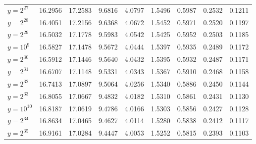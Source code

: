 \documentclass{article}
\theoremstyle{definition}
\begin{document}
\begin{table}[h!]
\begin{tabular}{l | rrrrrrrr}
        \hline
        $y = 2^{27}$  & 16.2956 & 17.2583               & 9.6816                & 4.0797                & 1.5496                & 0.5987                & 0.2532                & 0.1211                \\
        $y = 2^{28}$  & 16.4051 & 17.2156               & 9.6368                & 4.0672                & 1.5452                & 0.5971                & 0.2520                & 0.1197                \\
        $y = 2^{29}$  & 16.5032 & 17.1778               & 9.5983                & 4.0542                & 1.5425                & 0.5952                & 0.2503                & 0.1185                \\
        \hline
        $y = 10^{9}$  & 16.5827 & 17.1478               & 9.5672                & 4.0444                & 1.5397                & 0.5935                & 0.2489                & 0.1172                \\
        \hline
        $y = 2^{30}$  & 16.5912 & 17.1446               & 9.5640                & 4.0432                & 1.5395                & 0.5932                & 0.2487                & 0.1171                \\
        $y = 2^{31}$  & 16.6707 & 17.1148               & 9.5331                & 4.0343                & 1.5367                & 0.5910                & 0.2468                & 0.1158                \\
        $y = 2^{32}$  & 16.7413 & 17.0897               & 9.5064                & 4.0256                & 1.5340                & 0.5886                & 0.2450                & 0.1144                \\
        $y = 2^{33}$  & 16.8055 & 17.0667               & 9.4832                & 4.0182                & 1.5310                & 0.5861                & 0.2431                & 0.1130                \\
        \hline
        $y = 10^{10}$ & 16.8187 & 17.0619               & 9.4786                & 4.0166                & 1.5303                & 0.5856                & 0.2427                & 0.1128                \\
        \hline
        $y = 2^{34}$  & 16.8634 & 17.0465               & 9.4627                & 4.0114                & 1.5280                & 0.5838                & 0.2412                & 0.1117                \\
        $y = 2^{35}$  & 16.9161 & 17.0284               & 9.4447                & 4.0053                & 1.5252                & 0.5815                & 0.2393                & 0.1103                \\

\end{tabular}
\end{table}
\end{document}
